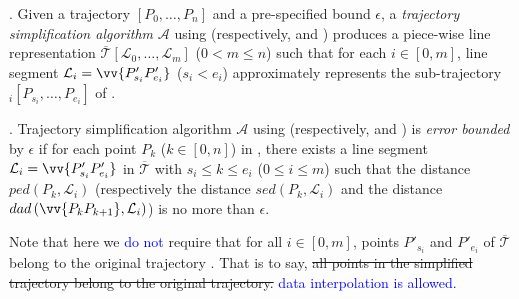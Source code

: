 
\stitle{\textcolor{blue}{Trajectory simplification algorithms}}. Given a trajectory $\left[P_0, \dots, P_n\right]$ and  a pre-specified bound $\epsilon$, a \emph{trajectory simplification algorithm} $\mathcal{A}$ using \ped  (respectively, \sed and \dad) produces a piece-wise line representation $\overline{\mathcal{T}}\left[\mathcal{L}_0, \ldots, \mathcal{L}_m\right]$ ($0< m \le n$) such that for each $i\in[0, m]$, line segment $\mathcal{L}_i = \vv{P'_{s_i}P'_{e_i}}$ ($s_i < e_i$) approximately represents the sub-trajectory $_i\left[P_{s_i}, \dots, P_{e_i}\right]$ of .

\stitle{\textcolor{blue}{Error bounded algorithms}}.
Trajectory simplification algorithm $\mathcal{A}$ using \ped  (respectively, \sed and \dad) is \emph{error bounded} by $\epsilon$ if for each point $P_k$ ($k\in[0,n]$) in , there exists a line segment $\mathcal{L}_i = \vv{P'_{s_i}P'_{e_i}}$ in $\overline{\mathcal{T}}$ with $s_i \le k \le e_i$ ($0\le i\le m$) such that the \ped distance $ped\left(P_k, \mathcal{L}_i\right)$  (respectively the \sed distance $sed\left(P_k, \mathcal{L}_i\right)$ and the \dad distance $dad\left(\vv{P_{k}P_{k+1}}, \mathcal{L}_i\right)$) is no more than  $\epsilon$.
%
 
Note that here we \textcolor{blue}{do not} require that for all $i\in[0,m]$, points $P'_{s_i}$ and $P'_{e_i}$ of $\overline{\mathcal{T}}$ belong to the original trajectory . That is to say, \sout{all points in the simplified trajectory belong to the original trajectory.} \textcolor{blue}{data interpolation is allowed.}
